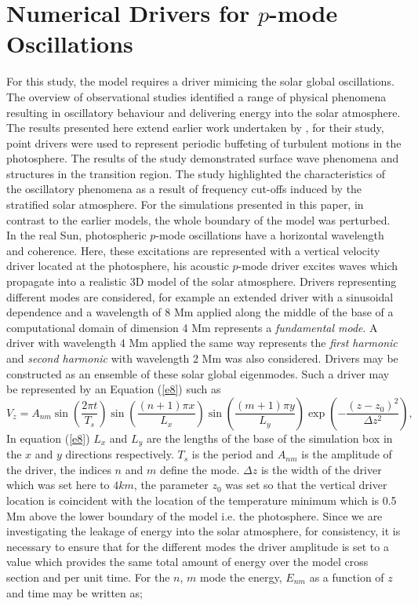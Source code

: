 \documentclass[preprint,authoryear,12pt]{elsarticle}
\begin{document}
\section{Numerical Drivers for $p$-mode Oscillations}
For this study, the model requires a driver mimicing the solar global oscillations.  The overview of observational studies identified a range of physical phenomena resulting in oscillatory behaviour and delivering energy into the solar atmosphere.  The results presented here extend earlier work undertaken by  \citet{Malins2007A}, for their study, point drivers were used to represent periodic buffeting of turbulent motions in the photosphere. The results of the study demonstrated surface wave 
phenomena and structures in the transition region. The study highlighted the characteristics of the oscillatory 
phenomena as a result of frequency cut-offs induced by the stratified solar atmosphere. For the simulations presented in this paper, 
in contrast to the earlier models, the whole boundary of the model was perturbed.  In the real Sun, photospheric $p$-mode 
oscillations have a horizontal wavelength and coherence. Here, these excitations are represented with a 
vertical velocity driver located at the photosphere, his acoustic $p$-mode driver excites waves which propagate 
into a realistic 3D model of the solar atmosphere. Drivers representing different modes are considered, for 
example  an extended driver with a sinusoidal dependence and a wavelength of 8 Mm applied along the 
middle of the base of a computational domain of dimension 4 Mm represents  a {\it fundamental mode}. 
A driver with wavelength 4 Mm applied the same way represents the {\it first harmonic} and {\it second harmonic} 
with wavelength 2 Mm was also considered. Drivers may be constructed as an ensemble of these solar 
global eigenmodes.  Such a driver may be represented 
by an Equation (\ref{e8}) such as  
\begin{equation}
V_{z}=A_{nm} \sin\left(\frac{2\pi t}{T_s} \right)\sin\left(  \frac{(n+1)\pi x}{L_x} \right)  \sin\left(\frac{(m+1)\pi y}{L_y} \right)
\exp\left( -\frac{(z-z_0)^2}{\Delta z^2} \right),
\label{e8}
\end{equation}
In equation (\ref{e8}) $L_{x}$ and $L_{y}$ are the lengths of the base of the simulation box in the $x$ and $y$ directions respectively. $T_{s}$ is the period and $A_{nm}$ is the amplitude of the driver, the indices $n$ and $m$ define the mode. $\Delta z$ is the width of the driver which was set here to $4km$, the parameter $z_{0}$ was set so that the vertical driver location is coincident with the location of the temperature minimum which is 0.5 Mm above the lower boundary of the model i.e. the photosphere.   Since we are investigating the leakage of energy into the solar atmosphere, for consistency, it is necessary to ensure that for the different modes the driver amplitude is set to a value which provides the same total amount of energy over the model cross section and per unit time. For the $n$, $m$ mode the energy, $E_{nm}$ as a function of $z$ and time may be written as;
\end{document}

